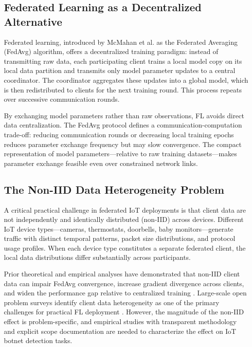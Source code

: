 \documentclass[11pt,a4paper]{article}
\begin{document}
\subsection{Federated Learning as a Decentralized Alternative}
Federated learning, introduced by McMahan et al. \cite{ref1} as the Federated Averaging (FedAvg) algorithm, offers a decentralized training paradigm: instead of transmitting raw data, each participating client trains a local model copy on its local data partition and transmits only model parameter updates to a central coordinator. The coordinator aggregates these updates into a global model, which is then redistributed to clients for the next training round. This process repeats over successive communication rounds.

By exchanging model parameters rather than raw observations, FL avoids direct data centralization. The FedAvg protocol defines a communication-computation trade-off: reducing communication rounds or decreasing local training epochs reduces parameter exchange frequency but may slow convergence. The compact representation of model parameters—relative to raw training datasets—makes parameter exchange feasible even over constrained network links.

\subsection{The Non-IID Data Heterogeneity Problem}
A critical practical challenge in federated IoT deployments is that client data are not independently and identically distributed (non-IID) across devices. Different IoT device types—cameras, thermostats, doorbells, baby monitors—generate traffic with distinct temporal patterns, packet size distributions, and protocol usage profiles. When each device type constitutes a separate federated client, the local data distributions differ substantially across participants.

Prior theoretical and empirical analyses have demonstrated that non-IID client data can impair FedAvg convergence, increase gradient divergence across clients, and widen the performance gap relative to centralized training \cite{ref5, ref6}. Large-scale open problem surveys identify client data heterogeneity as one of the primary challenges for practical FL deployment \cite{ref7}. However, the magnitude of the non-IID effect is problem-specific, and empirical studies with transparent methodology and explicit scope documentation are needed to characterize the effect on IoT botnet detection tasks.
\end{document}
